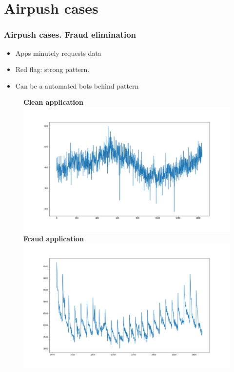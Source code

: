 \documentclass[intlimits, 9pt, unicode]{beamer}
\begin{document}
\section{Airpush cases}

\begin{frame}
    \frametitle{Airpush cases. Fraud elimination}
    \begin{itemize}
    	\item Apps minutely requests data
	\item Red flag: strong pattern.
	\item Can be a automated bots behind pattern
    \end{itemize}
    \begin{figure}
	\textbf{Clean application}
	\includegraphics[scale=0.10]{images/007_case_1}
	\textbf{Fraud application}
	\includegraphics[scale=0.10]{images/008_case_1}
     \end{figure}
	
\end{frame}
\end{document}
